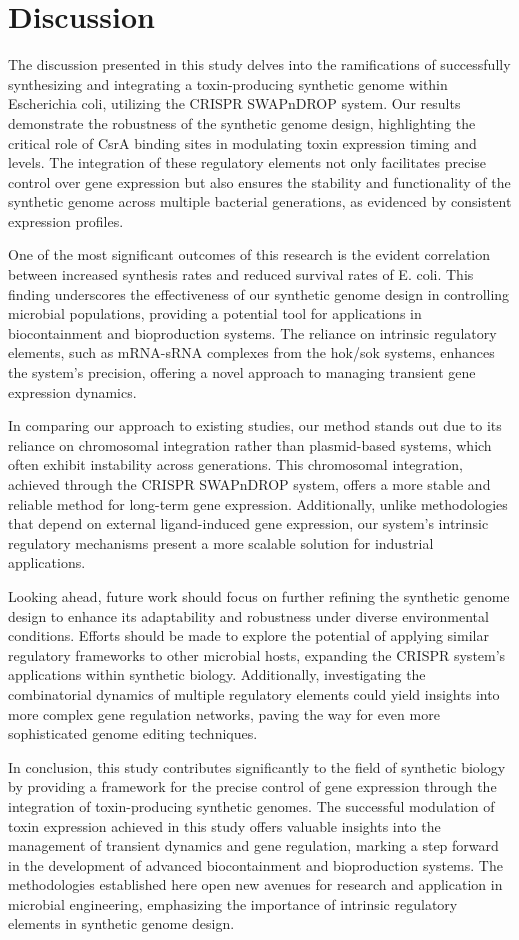 \documentclass{article}
\begin{document}
\section{Discussion}
The discussion presented in this study delves into the ramifications of successfully synthesizing and integrating a toxin-producing synthetic genome within Escherichia coli, utilizing the CRISPR SWAPnDROP system. Our results demonstrate the robustness of the synthetic genome design, highlighting the critical role of CsrA binding sites in modulating toxin expression timing and levels. The integration of these regulatory elements not only facilitates precise control over gene expression but also ensures the stability and functionality of the synthetic genome across multiple bacterial generations, as evidenced by consistent expression profiles.

One of the most significant outcomes of this research is the evident correlation between increased synthesis rates and reduced survival rates of E. coli. This finding underscores the effectiveness of our synthetic genome design in controlling microbial populations, providing a potential tool for applications in biocontainment and bioproduction systems. The reliance on intrinsic regulatory elements, such as mRNA-sRNA complexes from the hok/sok systems, enhances the system's precision, offering a novel approach to managing transient gene expression dynamics.

In comparing our approach to existing studies, our method stands out due to its reliance on chromosomal integration rather than plasmid-based systems, which often exhibit instability across generations. This chromosomal integration, achieved through the CRISPR SWAPnDROP system, offers a more stable and reliable method for long-term gene expression. Additionally, unlike methodologies that depend on external ligand-induced gene expression, our system's intrinsic regulatory mechanisms present a more scalable solution for industrial applications.

Looking ahead, future work should focus on further refining the synthetic genome design to enhance its adaptability and robustness under diverse environmental conditions. Efforts should be made to explore the potential of applying similar regulatory frameworks to other microbial hosts, expanding the CRISPR system's applications within synthetic biology. Additionally, investigating the combinatorial dynamics of multiple regulatory elements could yield insights into more complex gene regulation networks, paving the way for even more sophisticated genome editing techniques.

In conclusion, this study contributes significantly to the field of synthetic biology by providing a framework for the precise control of gene expression through the integration of toxin-producing synthetic genomes. The successful modulation of toxin expression achieved in this study offers valuable insights into the management of transient dynamics and gene regulation, marking a step forward in the development of advanced biocontainment and bioproduction systems. The methodologies established here open new avenues for research and application in microbial engineering, emphasizing the importance of intrinsic regulatory elements in synthetic genome design.
\end{document}
